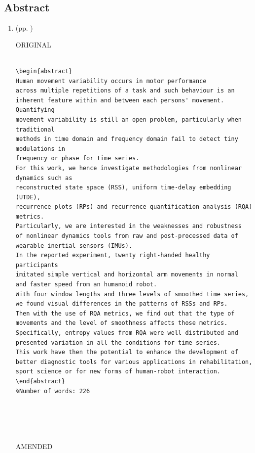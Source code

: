 \documentclass[10pt]{article}
\begin{document}
\subsection{Abstract}

\begin{enumerate}


\item  (pp. ) 

ORIGINAL
\begin{verbatim}

\begin{abstract}
Human movement variability occurs in motor performance 
across multiple repetitions of a task and such behaviour is an
inherent feature within and between each persons' movement. Quantifying
movement variability is still an open problem, particularly when traditional
methods in time domain and frequency domain fail to detect tiny modulations in
frequency or phase for time series. 
For this work, we hence investigate methodologies from nonlinear dynamics such as 
reconstructed state space (RSS), uniform time-delay embedding (UTDE), 
recurrence plots (RPs) and recurrence quantification analysis (RQA) metrics. 
Particularly, we are interested in the weaknesses and robustness 
of nonlinear dynamics tools from raw and post-processed data of 
wearable inertial sensors (IMUs). 
In the reported experiment, twenty right-handed healthy participants 
imitated simple vertical and horizontal arm movements in normal 
and faster speed from an humanoid robot.
With four window lengths and three levels of smoothed time series, 
we found visual differences in the patterns of RSSs and RPs. 
Then with the use of RQA metrics, we find out that the type of 
movements and the level of smoothness affects those metrics. 
Specifically, entropy values from RQA were well distributed and 
presented variation in all the conditions for time series. 
This work have then the potential to enhance the development of 
better diagnostic tools for various applications in rehabilitation, 
sport science or for new forms of human-robot interaction.
\end{abstract}
%Number of words: 226





\end{verbatim}
AMENDED
\begin{verbatim}



\end{verbatim}
\end{enumerate}
\end{document}
